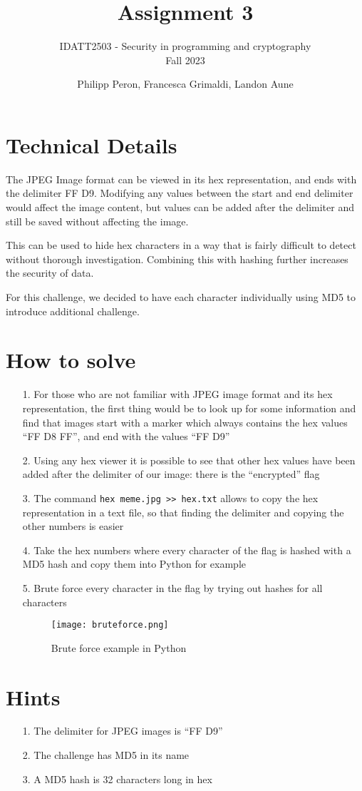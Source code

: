 \documentclass{article}
\title{%
    \huge Assignment 3}
\subtitle{%
    IDATT2503 - Security in programming and cryptography \\
    Fall 2023 \\
    }
\author{%
  Philipp Peron, Francesca Grimaldi, Landon Aune\\
}
\date{}
\begin{document}
\maketitle




\section{Technical Details}
The JPEG Image format can be viewed in its hex representation, and ends with the delimiter FF D9.
Modifying any values between the start and end delimiter would affect the image content, but values can be added after the delimiter and still be saved without affecting the image.

This can be used to hide hex characters in a way that is fairly difficult to detect without thorough investigation.
Combining this with hashing further increases the security of data.

For this challenge, we decided to have each character individually using MD5 to introduce additional challenge. 

\section{How to solve}

\begin{itemize}
    \item[1.]For those who are not familiar with JPEG image format and its hex representation, the first thing would be to look up for some information and find that images start with a marker which always contains the hex values “FF D8 FF”, and end with the values “FF D9”
    \item[2.]Using any hex viewer it is possible to see that other hex values have been added after the delimiter of our image: there is the “encrypted” flag
    \item[3.]The command \texttt{hex meme.jpg >> hex.txt} allows to copy the hex representation in a text file, so that finding the delimiter and copying the other numbers is easier
    \item[4.]Take the hex numbers where every character of the flag is hashed with a MD5 hash and copy them into Python for example
    \item[5.]Brute force every character in the flag by trying out hashes for all characters
    \begin{figure}[H]
        \centering
        \texttt{[image: bruteforce.png]}
        \caption{Brute force example in Python}
        \label{fig:bruteforce}
    \end{figure}
    
\end{itemize}

\section{Hints}

\begin{itemize}
    \item[1.]The delimiter for JPEG images is “FF D9”
    \item[2.]The challenge has MD5 in its name
    \item[3.]A MD5 hash is 32 characters long in hex
\end{itemize}
\end{document}
